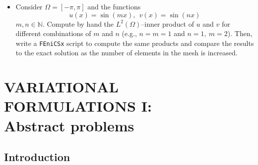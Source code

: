\begin{kaobox}[frametitle=Implement a script that]
\begin{itemize}
\item Consider $\Omega = [-\pi,\pi]$ and the functions
\begin{equation}
u(x) = \sin(m x),~~v(x) = \sin(n x)
\end{equation}
$m,n\in \mathbb{N}$. Compute by hand the $L^2(\Omega)$--inner product of $u$ and $v$ for different
combinations of $m$ and $n$ (e.g., $n=m=1$ and $n =1,~m=2$).
Then, write a \texttt{FEniCSx} script to compute the same products
and compare the results to the exact solution as the number of elements in
the mesh is increased.

\end{itemize}

\end{kaobox}


\setchapterpreamble[u]{\margintoc}
\chapter{VARIATIONAL FORMULATIONS I:\\Abstract problems}

\section{Introduction}

